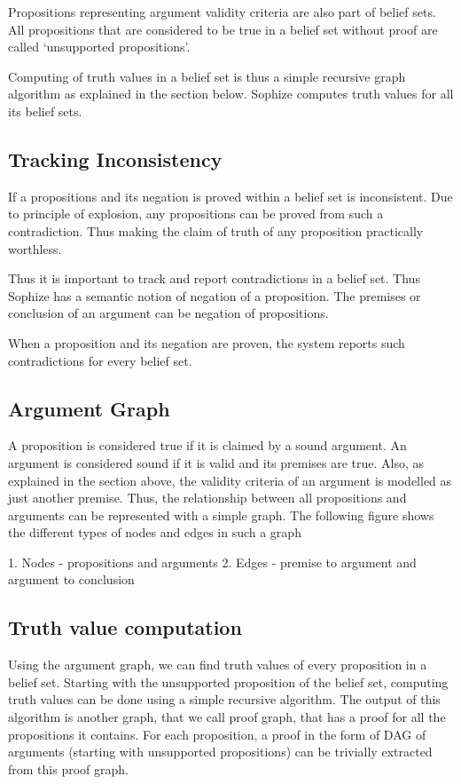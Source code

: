 \documentclass[a4paper]{article}
\begin{document}
Propositions representing argument validity criteria are also part of belief sets. All propositions that are considered to be true in a belief set without proof are called `unsupported propositions'.

Computing of truth values in a belief set is thus a simple recursive graph algorithm as explained in the section below. Sophize computes truth values for all its belief sets.

\subsection{Tracking Inconsistency}
If a propositions and its negation is proved within a belief set is inconsistent. Due to principle of explosion, any propositions can be proved from such a contradiction. Thus making the claim of truth of any proposition practically worthless.

Thus it is important to track and report contradictions in a belief set. Thus Sophize has a semantic notion of negation of a proposition. The premises or conclusion of an argument can be negation of propositions.

When a proposition and its negation are proven, the system reports such contradictions for every belief set.

\subsection{Argument Graph}
A proposition is considered true if it is claimed by a sound argument. An argument is considered sound if it is valid and its premises are true. Also, as explained in the section above, the validity criteria of an argument is modelled as just another premise. Thus, the relationship between all propositions and arguments can be represented with a simple graph. The following figure shows the different types of nodes and edges in such a graph

1. Nodes - propositions and arguments
2. Edges - premise to argument and argument to conclusion

\subsection{Truth value computation}

Using the argument graph, we can find truth values of every proposition in a belief set. Starting with the unsupported proposition of the belief set, computing truth values can be done using a simple recursive algorithm. The output of this algorithm is another graph, that we call proof graph, that has a proof for all the propositions it contains. For each proposition, a proof in the form of DAG of arguments (starting with unsupported propositions) can be trivially extracted from this proof graph.
\end{document}
